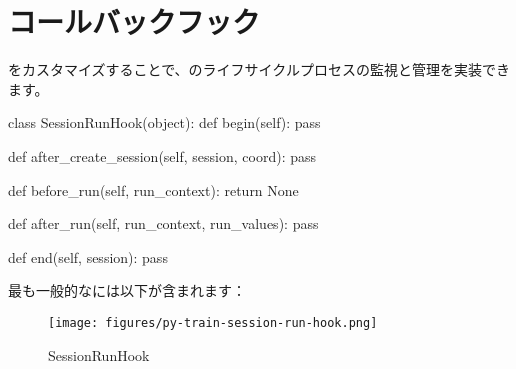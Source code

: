 \section{コールバックフック}

\begin{content}

をカスタマイズすることで、のライフサイクルプロセスの監視と管理を実装できます。

\begin{leftbar}
\begin{python}
class SessionRunHook(object):
  def begin(self):
    pass

  def after_create_session(self, session, coord):
    pass

  def before_run(self, run_context):
    return None

  def after_run(self, run_context, run_values):
    pass

  def end(self, session):
    pass
\end{python}
\end{leftbar}

最も一般的なには以下が含まれます：

\begin{enum}
\end{enum}

\begin{figure}[!htbp]
\centering
\texttt{[image: figures/py-train-session-run-hook.png]}
\caption{SessionRunHook}
 \label{fig:py-train-session-run-hook}
\end{figure}

\end{content}
